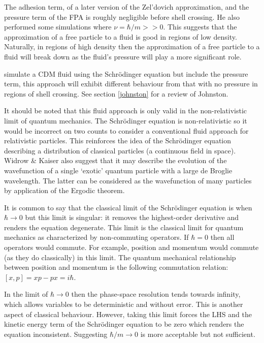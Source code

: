 The adhesion term, of a later version of the Zel'dovich approximation, and the pressure term of the FPA is roughly negligible before shell crossing. He also performed some simulations where $\nu = \hbar / m >> 0$. This suggests that the approximation of a free particle to a fluid is good in regions of low density. Naturally, in regions of high density then the approximation of a free particle to a fluid will break down as the fluid's pressure will play a more significant role.

\citet{bib_rj} simulate a CDM fluid using the Schr\"odinger equation but include the pressure term, this approach will exhibit different behaviour from that with no pressure in regions of shell crossing. See section \ref{johnston} for a review of Johnston.
\newline

It should be noted that this fluid approach is only valid in the non-relativistic limit of quantum mechanics. The Schr\"odinger equation is non-relativistic so it would be incorrect on two counts to consider a conventional fluid approach for relativistic particles. This reinforces the idea of the Schr\"odinger equation describing a distribution of classical particles (a continuous field in space). Widrow \& Kaiser also suggest that it may describe the evolution of the wavefunction of a single `exotic' quantum particle with a large de Broglie wavelength. The latter can be considered as the wavefunction of many particles by application of the Ergodic theorem.

It is common to say that the classical limit of the Schr\"odinger equation is when $\hbar \rightarrow 0$ but this limit is singular: it removes the highest-order derivative and renders the equation degenerate. This limit is the classical limit for quantum mechanics as characterized by non-commuting operators. If $\hbar = 0$ then all operators would commute. For example, position and momentum would commute (as they do classically) in this limit. The quantum mechanical relationship between position and momentum is the following commutation relation: $ [x,p] = xp - px = i\hbar$.

In the limit of $\hbar \rightarrow 0$ then the phase-space resolution tends towards infinity, which allows variables to be deterministic and without error. This is another aspect of classical behaviour. However, taking this limit forces the LHS and the kinetic energy term of the Schr\"odinger equation to be zero which renders the equation inconsistent. Suggesting $\hbar /m \rightarrow 0$ is more acceptable but not sufficient.
\newline

